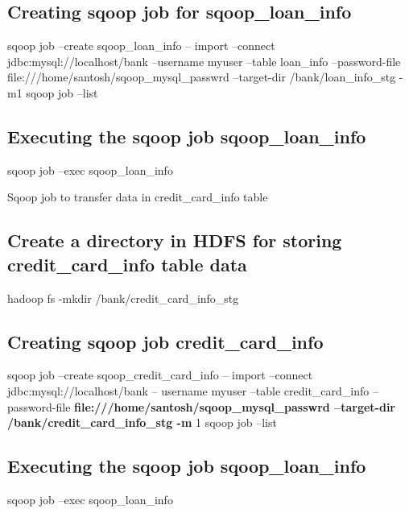 \subsection{Creating sqoop job for sqoop\_loan\_info}
sqoop job --create sqoop\_loan\_info -- import --connect \newline jdbc:mysql://localhost/bank \newline
--username \newline
myuser \newline
--table \newline
loan\_info  \newline
--password-file  \newline
file:///home/santosh/sqoop\_mysql\_passwrd --target-dir  \newline /bank/loan\_info\_stg -m1  \newline
sqoop job --list  \newline

\subsection{Executing the sqoop job sqoop\_loan\_info}

sqoop job --exec sqoop\_loan\_info \newline

Sqoop job to transfer data in credit\_card\_info table \newline

\subsection{Create a directory in HDFS for storing credit\_card\_info table data}

hadoop fs -mkdir /bank/credit\_card\_info\_stg

\subsection{Creating sqoop job credit\_card\_info}

sqoop job --create sqoop\_credit\_card\_info -- import --connect \newline
jdbc:mysql://localhost/bank -- \newline
username myuser --table credit\_card\_info --password-file\newline
\textbf{file:///home/santosh/sqoop\_mysql\_passwrd --target-dir /bank/credit\_card\_info\_stg -m} 1
sqoop job --list

\subsection{Executing the sqoop job sqoop\_loan\_info}
sqoop job --exec sqoop\_loan\_info

